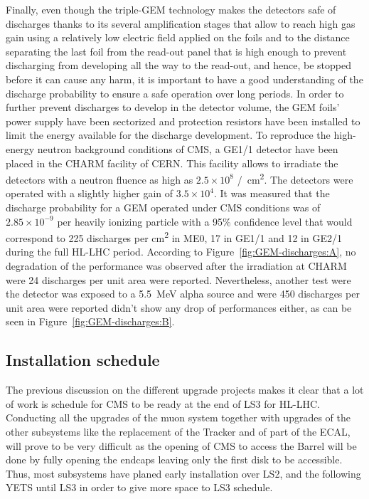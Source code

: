 	Finally, even though the triple-GEM technology makes the detectors safe of discharges thanks to its several amplification stages that allow to reach high gas gain using a relatively low electric field applied on the foils and to the distance separating the last foil from the read-out panel that is high enough to prevent discharging from developing all the way to the read-out, and hence, be stopped before it can cause any harm, it is important to have a good understanding of the discharge probability to ensure a safe operation over long periods. In order to further prevent discharges to develop in the detector volume, the GEM foils' power supply have been sectorized and protection resistors have been installed to limit the energy available for the discharge development. To reproduce the high-energy neutron background conditions of CMS, a GE1/1 detector have been placed in the CHARM facility of CERN. This facility allows to irradiate the detectors with a neutron fluence as high as $2.5 \times 10^8$ \si{/cm^2}. The detectors were operated with a slightly higher gain of $3.5 \times 10^4$. It was measured that the discharge probability for a GEM operated under CMS conditions was of $2.85 \times 10^{-9}$ per heavily ionizing particle with a 95\% confidence level that would correspond to 225 discharges per \si{cm^2} in ME0, 17 in GE1/1 and 12 in GE2/1 during the full HL-LHC period. According to Figure~\ref{fig:GEM-discharges:A}, no degradation of the performance was observed after the irradiation at CHARM were 24 discharges per unit area were reported. Nevertheless, another test were the detector was exposed to a \SI{5.5}{MeV} alpha source and were 450 discharges per unit area were reported didn't show any drop of performances either, as can be seen in Figure~\ref{fig:GEM-discharges:B}.
	
	\subsection{Installation schedule}
	\label{chapt3:ssec:schedule}
	
	The previous discussion on the different upgrade projects makes it clear that a lot of work is schedule for CMS to be ready at the end of LS3 for HL-LHC. Conducting all the upgrades of the muon system together with upgrades of the other subsystems like the replacement of the Tracker and of part of the ECAL, will prove to be very difficult as the opening of CMS to access the Barrel will be done by fully opening the endcaps leaving only the first disk to be accessible. Thus, most subsystems have planed early installation over LS2, and the following YETS until LS3 in order to give more space to LS3 schedule.\\
	
